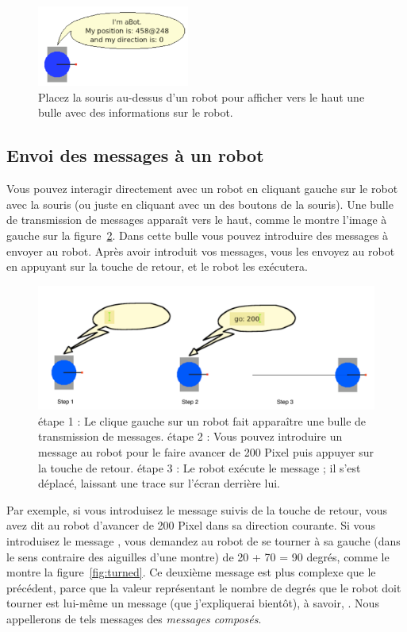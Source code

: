 \documentclass[a4paper,10pt,twoside]{book}
\begin{document}
\begin{figure}[h]\centerline{\includegraphics[width=5cm]{8-firstBalloon2}}
\caption{Placez la souris au-dessus d'un robot pour afficher vers le haut une bulle avec des informations sur le robot. \label{fig:firstBalloon}}
\end{figure}


\subsection{Envoi des messages \`a un robot}

Vous pouvez interagir directement avec un robot en cliquant gauche sur le robot avec la souris (ou juste en cliquant avec un des boutons de la souris). Une bulle de transmission de messages appara\^it vers le haut, comme le montre l'image \`a gauche sur la figure~\ref{fig:go}. Dans cette bulle vous pouvez introduire des messages \`a envoyer au robot. Apr\`es avoir introduit vos messages, vous les envoyez au robot en appuyant sur la touche de retour, et le robot les ex\'ecutera.

\begin{figure}[h]\centerline{\includegraphics[width=\linewidth]{9-sendingAMsg2}}
\caption{\'etape 1 : Le clique gauche sur un robot fait appara\^itre une bulle de transmission de messages. \'etape 2 : Vous pouvez introduire un message au robot pour le faire avancer de 200 Pixel puis  appuyer sur la touche de retour. \'etape 3 : Le robot ex\'ecute le message ; il s'est d\'eplac\'e, laissant une trace sur l'\'ecran derri\`ere lui.\label{fig:go}}
\end{figure}

Par exemple, si vous introduisez le message  suivis de la touche de retour, vous avez dit au robot d'avancer de 200 Pixel dans sa direction courante. Si vous introduisez le message , vous demandez au robot de se tourner \`a sa gauche (dans le sens contraire des aiguilles d'une montre)  de 20 + 70 = 90 degr\'es, comme le montre la figure~\ref{fig:turned}. Ce deuxi\`eme message est plus complexe que le pr\'ec\'edent, parce que la valeur repr\'esentant le nombre de degr\'es que le robot doit tourner est lui-m\^eme un message (que j'expliquerai bient\^ot), \`a savoir, . Nous appellerons de tels messages des \emph{messages compos\'es}.
\end{document}
